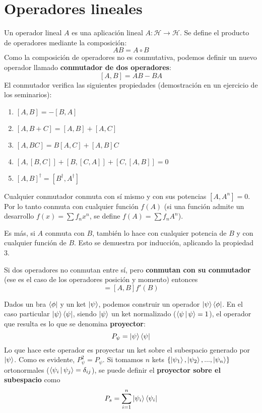 \documentclass[12pt]{report}
\begin{document}
\section{Operadores lineales}
Un operador lineal $A$ es una aplicación lineal $A:\mathcal{H}\to\mathcal{H}$. Se define el producto de operadores mediante la composición:
 \begin{equation}
	AB=A\circ B
\end{equation}
Como la composición de operadores no es conmutativa, podemos definir un nuevo operador llamado \textbf{conmutador de dos operadores}:
\begin{equation}
	\left[ A,B\right] =AB-BA
\end{equation}
El conmutador verifica las siguientes propiedades (demostración en un ejercicio de los seminarios):
\begin{enumerate}
    \item $[A,B]=-[B,A]$
    \item $[A,B+C]=[A,B]+[A,C]$
    \item $[A,BC]=B[A,C]+[A,B]C$
    \item $[A,[B,C]]+[B,[C,A]]+[C,[A,B]]=0$
    \item $[A,B]^\dagger =[B^\dagger ,A^\dagger ]$
\end{enumerate}
Cualquier conmutador conmuta con sí mismo y con sus potencias $[A,A^n]=0$. Por lo tanto conmuta con cualquier función $f(A)$ (si una función admite un desarrollo $f(x)=\sum f_n x^n$, se define $f(A)=\sum f_n A^n$).

Es más, si $A$ conmuta con $B$, también lo hace con cualquier potencia de $B$ y con cualquier función de $B$. Esto se demuestra por inducción, aplicando la propiedad 3.

Si dos operadores no conmutan entre sí, pero \textbf{conmutan con su conmutador} (ese es el caso de los operadores posición y momento) entonces
\begin{equation}
    [A,f(B)]=[A,B]f'(B)
\end{equation}

Dados un bra $\bra{\phi }$ y un ket $\ket{\psi }$, podemos construir un operador $\ket{\psi }\bra{\phi }$. En el caso particular $\ket{\psi }\bra{\psi }$, siendo $\ket{\psi }$ un ket normalizado ($\Braket{\psi |\psi}=1$), el operador que resulta es lo que se denomina \textbf{proyector}:
\begin{equation}
	P_{\psi }=\ket{\psi }\bra{\psi}
\end{equation}
Lo que hace este operador es proyectar un ket sobre el subespacio generado por $\ket{\psi }$. Como es evidente, $P_{\psi }^{2}=P_{\psi}$. Si tomamos $n$ kets  $\left\{ \ket{\psi_{1}},\ket{\psi_{2}},...,\ket{\psi_{n}}\right\}$ ortonormales ($\Braket{\psi_{i}|\psi_{j}}=\delta_{ij}$), se puede definir el \textbf{proyector sobre el subespacio} como
\begin{equation}
	P_{s}=\sum_{i=1}^{n}\ket{\psi_{i}}\bra{\psi_{i}}
\end{equation}
\end{document}
